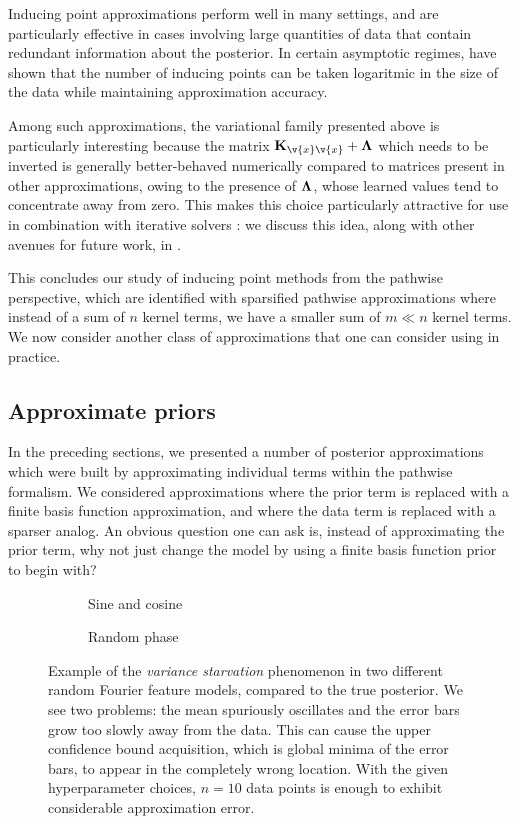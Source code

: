 \documentclass[11pt]{book}
\begin{document}
Inducing point approximations perform well in many settings, and are particularly effective in cases involving large quantities of data that contain redundant information about the posterior.
In certain asymptotic regimes, \textcite{burt19} have shown that the number of inducing points can be taken logaritmic in the size of the data while maintaining approximation accuracy.

Among such approximations, the variational family presented above is particularly interesting because the matrix $\m{K}_{\v{x}\v{x}} + \m\Lambda$ which needs to be inverted is generally better-behaved numerically compared to matrices present in other approximations, owing to the presence of $\m\Lambda$, whose learned values tend to concentrate away from zero.
This makes this choice particularly attractive for use in combination with iterative solvers \cite{dong17,gardner18,pleiss18,meanti20,pleiss20}: we discuss this idea, along with other avenues for future work, in .

This concludes our study of inducing point methods from the pathwise perspective, which are identified with sparsified pathwise approximations where instead of a sum of $n$ kernel terms, we have a smaller sum of $m \ll n$ kernel terms.
We now consider another class of approximations that one can consider using in practice.

\subsection{Approximate priors}
In the preceding sections, we presented a number of posterior approximations which were built by approximating individual terms within the pathwise formalism.
We considered approximations where the prior term is replaced with a finite basis function approximation, and where the data term is replaced with a sparser analog.
An obvious question one can ask is, instead of approximating the prior term, why not just change the model by using a finite basis function prior to begin with?

\begin{figure}
\begin{subfigure}{0.98\textwidth}

\end{subfigure}
\begin{subfigure}{0.49\textwidth}

\caption{Sine and cosine}
\end{subfigure}
\begin{subfigure}{0.49\textwidth}

\caption{Random phase}
\end{subfigure}
\caption[Variance starvation in Fourier feature models]{Example of the \emph{variance starvation} phenomenon in two different random Fourier feature models, compared to the true posterior.
We see two problems: the mean spuriously oscillates and the error bars grow too slowly away from the data.
This can cause the upper confidence bound acquisition, which is global minima of the error bars, to appear in the completely wrong location.
With the given hyperparameter choices, $n=10$ data points is enough to exhibit considerable approximation error.}
\label{fig:gp-vs}
\end{figure}
\end{document}
